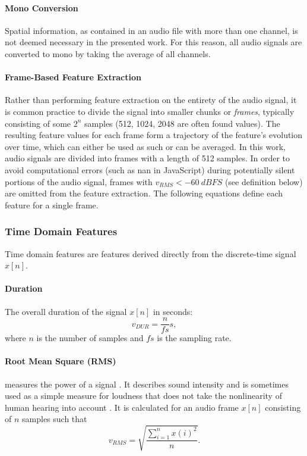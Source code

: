 \paragraph*{Mono Conversion}
\label{para:mono_conversion}
Spatial information, as contained in an audio file with more than one channel,
is not deemed necessary in the presented work. For this reason, all audio
signals are converted to mono by taking the average of all channels.

\paragraph*{Frame-Based Feature Extraction}
\label{para:frame_based_extraction}
Rather than performing feature extraction on the entirety of the audio signal,
it is common practice to divide the signal into smaller chunks or
\textit{frames}, typically consisting of some $2^n$ samples (512, 1024, 2048
are often found values). The resulting feature values for each frame form a
trajectory of the feature's evolution over time, which can either be used as
such or can be averaged. In this work, audio signals are divided into frames
with a length of 512 samples.
In order to avoid computational errors (such as \gls{nan} in JavaScript) during
potentially silent portions of the audio signal, frames with
$v_{RMS} < \SI{-60}{dBFS}$ (see  definition below) are omitted
from the feature extraction. The following equations define each feature for a
single frame.

\subsubsection{Time Domain Features}
\label{subsubsec:temporal_features}
Time domain features are features derived directly from the discrete-time
signal $x[n]$.

\paragraph*{Duration}
\label{para:duration}
The overall duration of the signal $x[n]$ in seconds:
\begin{equation}
  v_{DUR} = \frac{n}{fs}s,
\end{equation}
where $n$ is the number of samples and $fs$ is the sampling rate.

\paragraph*{Root Mean Square (RMS)}
\label{para:rms}
measures the power of a signal \citep[p.73f]{lerch2012}. It describes sound intensity and is sometimes used as a simple measure for loudness
\citep{web:meyda2019_features} that does not take the nonlinearity of human
hearing into account \citep{fletcher1933}. It is calculated for an audio
frame $x[n]$ consisting of $n$ samples such that
\begin{equation}
  v_{RMS} = \sqrt{ \frac{ \sum\limits_{i=1}^{n} x(i)^2} {n}}.
\end{equation}


